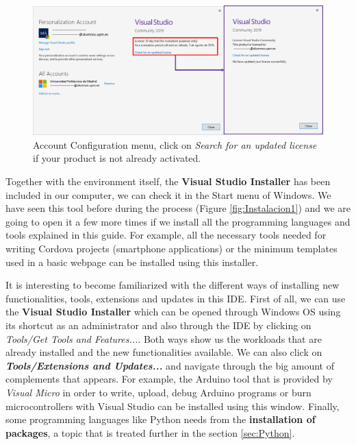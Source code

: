 \begin{figure}
    \centering
    \includegraphics[width= \textwidth]{Figures/Instalacion4}
    \caption{Account Configuration menu, click on \textit{Search for an updated license} if your product is not already activated.}
    \label{fig:Instalacion4}
\end{figure}


Together with the environment itself, the \textbf{Visual Studio Installer} has been included in our computer, we can check it in the Start menu of Windows. We have seen this tool before during the process (Figure \ref{fig:Instalacion1}) and we are going to open it a few more times if we install all the programming languages and tools explained in this guide. For example, all the necessary tools needed for writing Cordova projects (smartphone applications) or the minimum templates used in a basic webpage can be installed using this installer.

It is interesting to become familiarized with the different ways of installing new functionalities, tools, extensions and updates in this IDE. First of all, we can use the \textbf{Visual Studio Installer} which can be opened through Windows OS using its shortcut as an administrator and also through the IDE by clicking on \textit{Tools/Get Tools and Features...}. Both ways show us the workloads that are already installed and the new functionalities available. We can also click on \textbf{\textit{Tools/Extensions and Updates...}} and navigate through the big amount of complements that appears. For example, the Arduino tool that is provided by \textit{Visual Micro} in order to write, upload, debug Arduino programs or burn microcontrollers with Visual Studio can be installed using this window. Finally, some programming languages like Python needs from the \textbf{installation of packages}, a topic that is treated further in the section \ref{sec:Python}.


